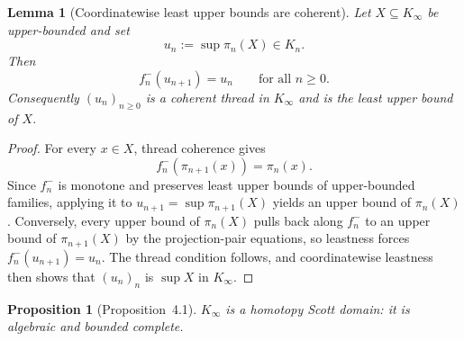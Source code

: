 \documentclass[webpdf,traditional,large,numbered]{oup-authoring-template}
\theoremstyle{thmstyleone}%
\newtheorem{proposition}[theorem]{Proposition}
\newtheorem{lemma}[theorem]{Lemma}
\theoremstyle{thmstyletwo}%
\theoremstyle{thmstylethree}%
\newcommand{\Kinf}{K_\infty}
\begin{document}
\begin{lemma}[Coordinatewise least upper bounds are coherent]\label{lem:coordinate-lub}
  Let $X\subseteq \Kinf$ be upper-bounded and set
  \[
    u_n:=\sup \pi_n(X)\in K_n.
  \]
  Then
  \[
    f_n^-(u_{n+1})=u_n
    \qquad\text{for all }n\ge 0.
  \]
  Consequently $(u_n)_{n\ge 0}$ is a coherent thread in $\Kinf$ and is the
  least upper bound of $X$.
\end{lemma}

\begin{proof}
  For every $x\in X$, thread coherence gives
  \[
    f_n^-(\pi_{n+1}(x))=\pi_n(x).
  \]
  Since $f_n^-$ is monotone and preserves least upper bounds of upper-bounded
  families, applying it to $u_{n+1}=\sup \pi_{n+1}(X)$ yields an upper bound of
  $\pi_n(X)$.  Conversely, every upper bound of $\pi_n(X)$ pulls back along
  $f_n^-$ to an upper bound of $\pi_{n+1}(X)$ by the projection-pair equations,
  so leastness forces $f_n^-(u_{n+1})=u_n$.  The thread condition follows, and
  coordinatewise leastness then shows that $(u_n)_n$ is $\sup X$ in $\Kinf$.
\end{proof}

\begin{proposition}[Proposition~4.1]
  $\Kinf$ is a homotopy Scott domain: it is algebraic and bounded complete.
\end{proposition}
\end{document}
